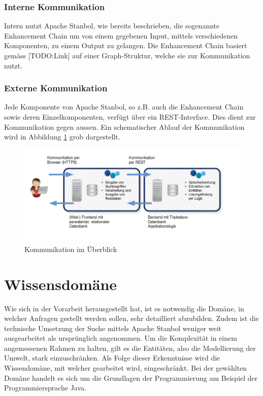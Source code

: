 \subsection{Interne Kommunikation}
\label{sec:architektur_schnittstellen_intern}
Intern nutzt Apache Stanbol, wie bereits beschrieben, die sogenannte Enhancement Chain um von einem gegebenen Input, mittels verschiedenen Komponenten, zu einem Output zu gelangen. Die Enhancement Chain basiert gemäss [TODO:Link] auf einer Graph-Struktur, welche sie zur Kommunikation nutzt.

\subsection{Externe Kommunikation}
\label{sec:architektur_schnittstellen_extern}
Jede Komponente von Apache Stanbol, so z.B. auch die Enhancement Chain sowie deren Einzelkomponenten, verfügt über ein REST-Interface. Dies dient zur Kommunikation gegen aussen. Ein schematischer Ablauf der Kommunikation wird in Abbildung \ref{fig:kommunikationKomponenten} grob dargestellt.

\begin{figure}[H]
	\centering
		\includegraphics[scale=0.7]{bilder/software_komponenten.png}
	\caption{Kommunikation im Überblick}
	\label{fig:kommunikationKomponenten}
\end{figure}

\chapter{Wissensdomäne}
\label{chap:wissensdomäne}
Wie sich in der Vorarbeit herausgestellt hat, ist es notwendig die Domäne, in welcher Anfragen gestellt werden sollen, sehr detailliert abzubilden. Zudem ist die technische Umsetzung der Suche mittels Apache Stanbol weniger weit ausgearbeitet als ursprünglich angenommen. Um die Komplexität in einem angemessenen Rahmen zu halten, gilt es die Entitäten, also die Modellierung der Umwelt, stark einzuschränken. 
Als Folge dieser Erkenntnisse wird die Wissendomäne, mit welcher gearbeitet wird, eingeschränkt. Bei der gewählten Domäne handelt es sich um die Grundlagen der Programmierung am Beispiel der Programmiersprache Java.

